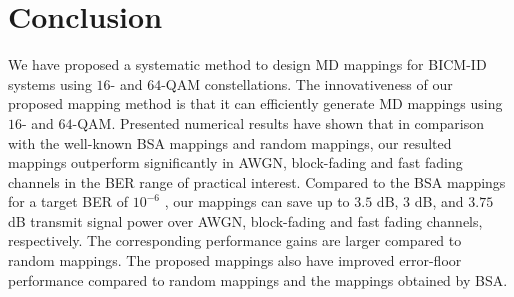 \documentclass[12pt, draftclsnofoot, onecolumn]{IEEEtran}
\begin{document}
\section{Conclusion}
\label{conc.}
We have proposed a systematic     method to design  MD mappings for BICM-ID systems using  $16$- and $64$-QAM  constellations. The innovativeness of our proposed mapping  method is that it   can  efficiently generate  MD mappings  using $16$- and $64$-QAM.   Presented numerical results have  shown that in comparison with the well-known BSA  mappings   and random mappings, \color{black}   our resulted mappings outperform  significantly in AWGN,    block-fading \color{black}  and  fast fading channels in the BER  range of practical interest.   Compared to the BSA mappings for a target BER of $10^{-6}$ \color{black}, our mappings can save up to { $3.5$} dB, { $3$} dB, and  $3.75$ dB transmit signal power over  AWGN,   block-fading \color{black} and fast fading channels, respectively.   The corresponding performance gains  are larger compared to  random mappings. \color{black}    The proposed mappings also have  improved  error-floor  performance compared to   random mappings and \color{black} the mappings obtained  by BSA. 
\end{document}
